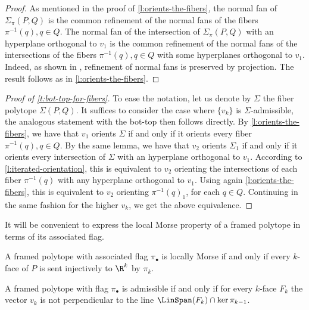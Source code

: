 \begin{proof}
	As mentioned in the proof of \cref{l:orients-the-fibers}, the normal fan of $\Sigma_\pi(P,Q)$ is the common refinement of the normal fans of the fibers $\pi^{-1}(q), q \in Q$.
	The normal fan of the intersection of $\Sigma_\pi(P,Q)$ with an hyperplane orthogonal to $v_1$ is the common refinement of the normal fans of the intersections of the fibers $\pi^{-1}(q), q \in Q$ with some hyperplanes orthogonal to $v_1$.
	Indeed, as shown in \cite[Lemma 3.1]{BilleraSturmfels94}, refinement of normal fans is preserved by projection.
	The result follows as in \cref{l:orients-the-fibers}.
\end{proof}

\begin{proof}[Proof of \cref{t:bot-top-for-fibers}]
	To ease the notation, let us denote by $\Sigma$ the fiber polytope $\Sigma(P,Q)$.
	It suffices to consider the case where $\{v_k\}$ is $\Sigma$-admissible, the analogous statement with the bot-top then follows directly.
	By \cref{l:orients-the-fibers}, we have that $v_1$ orients $\Sigma$ if and only if it orients every fiber $\pi^{-1}(q), q \in Q$.
	By the same lemma, we have that $v_2$ orients $\Sigma_1$ if and only if it orients every intersection of $\Sigma$ with an hyperplane orthogonal to $v_1$.
	According to \cref{l:iterated-orientation}, this is equivalent to $v_2$ orienting the intersections of each fiber $\pi^{-1}(q)$ with any hyperplane orthogonal to $v_1$.
	Using again \cref{l:orients-the-fibers}, this is equivalent to $v_2$ orienting $\pi^{-1}(q)_1$, for each $q \in Q$.
	Continuing in the same fashion for the higher $v_k$, we get the above equivalence.
\end{proof}

It will be convenient to express the local Morse property of a framed polytope in terms of its associated flag.

\begin{lemma}
	A framed polytope with associated flag $\pi_\bullet$ is locally Morse if and only if every $k$-face of $P$ is sent injectively to $\R^k$ by $\pi_k$.
\end{lemma}

\begin{lemma} \label{l:P-admissible}
	A framed polytope with flag $\pi_\bullet$ is admissible if and only if for every $k$-face $F_k$ the vector $v_k$ is not perpendicular to the line $\LinSpan(F_k) \cap \ker \pi_{k-1}$.
\end{lemma}

